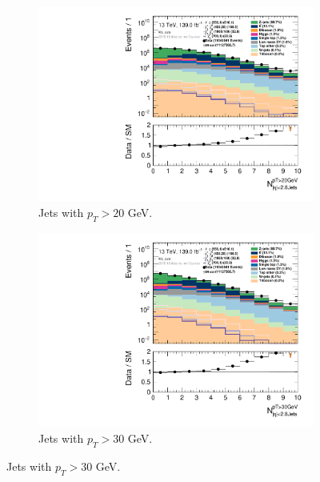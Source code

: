 \begin{figure}[H]\ContinuedFloat
\centering
    \begin{subfigure}[t!]{0.49\textwidth}
        \includegraphics[width=\textwidth]{Figures/ML_cuts/hist1d_nJet20_ML_cuts.pdf}
    \caption{Jets with $p_T > 20$ GeV.}
    \label{fig:my_label}
    \end{subfigure}
    \begin{subfigure}[t!]{0.49\textwidth}
        \includegraphics[width=\textwidth]{Figures/ML_cuts/hist1d_nJet30_ML_cuts.pdf}
   \caption{Jets with $p_T > 30$ GeV.}
   \label{fig:my_label}
    \end{subfigure}

\end{figure}

